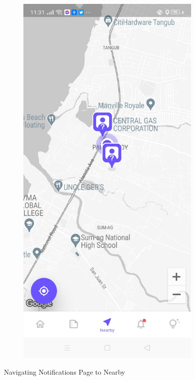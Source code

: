 \begin{figure}[!h]
\begin{subfigure}[c]{0.30\linewidth}
        \centering
        \includegraphics[scale=0.15]{figures/Chapter4/Main/Nearby-1.jpg}
    \end{subfigure}
    \caption{Navigating Notifications Page to Nearby}
    \label{fig:notifications}
\end{figure}

